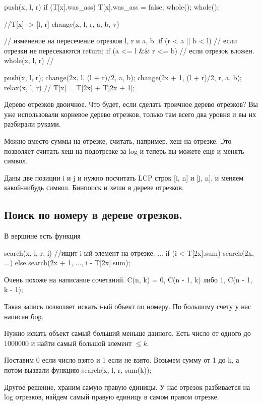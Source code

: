 \begin{cppcode}
push(x, l, r) {
    if (T[x].was_ass) {
        T[x].was_ass = false;
        whole();
        whole();
    }
}

//T[x] -> [l, r]
change(x, l, r, a, b, v) { // изменение на пересечение отрезков l, r и a, b.
    if (r < a || b < l)  { // если  отрезки не пересекаются
        return;
    }
    if (a <= l && r <= b) { // если отрезок вложен. 
        whole(x, l, r) //
    }

    push(x, l, r);
    change(2x, l, (l + r)/2, a, b);
    change(2x + 1, (l + r)/2, r, a, b);
    relax(x, l, r) // T[x] = T[2x] + T[2x + 1];
}
\end{cppcode}

Дерево отрезков двоичное. Что будет, если сделать троичное дерево отрезков? Вы уже использовали корневое дерево отрезков, только 
там всего два уровня и вы их разбирали руками. 

Можно вместо суммы на отрезке, считать, например, хеш на отрезке. Это позволяет считать хеш на подотрезке за log и теперь вы можете еще и менять символ.

Даны две позиции i и j  и нужно посчитать LCP строк [i, n] и [j, n], и меняем какой-нибудь символ. Бинпоиск и хеши в дереве отрезков.

\subsection{Поиск по номеру в дереве отрезков.}
В вершине есть функция
\begin{cppcode}
search(x, l, r, i) {//ищит i-ый элемент на отрезке.
    ...
    if (i < T[2x].sum) {
        search(2x, ...)
    } else {
        search(2x + 1, ..., i - T[2x].sum);
    }
}
\end{cppcode}  

Очень похоже на написание сочетаний.
C(n, k) = 0, C(n - 1, k) либо 1, C(n - 1, k - 1);

Такая запись позволяет искать i-ый объект по номеру. По большому счету у нас написан бор.

Нужно искать объект самый больший меньше данного. Есть число от одного до 1000000 и найти самый большой элемент $\le k$.

Поставим 0 если число взято и 1 если не взято. Возьмем сумму от 1 до k, а потом вызвали функцию search(x, l, r, sum(k));

Другое решение, храним самую правую единицы.  У нас отрезок разбивается на log отрезков, найдем самый правую единицу в самом правом отрезке.

